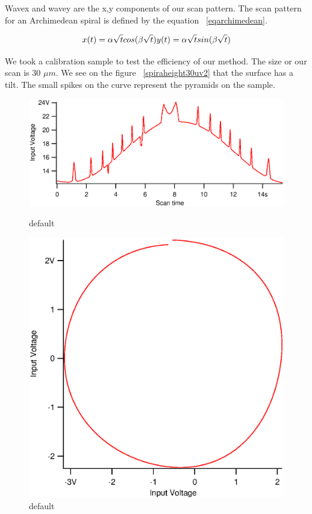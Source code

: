 Wavex and wavey are the x,y components of our scan pattern. The scan pattern for an Archimedean spiral is defined by the equation  ~\ref{eqarchimedean}.

\begin{equation}\label{eqarchimedean}
x(t)= \alpha \sqrt{t} cos(\beta \sqrt{t})\\
y(t)= \alpha \sqrt{t} sin(\beta \sqrt{t})
\end{equation}

We took a calibration sample to test the efficiency of our method. The size or our scan is 30 $\mu m$. We see on the figure  ~\ref{spiraheight30uv2} that the surface has a tilt. The small spikes on the curve represent the pyramids on the sample.

\begin{figure}[ht]
\begin{minipage}[b]{0.45\linewidth}
\centering
\includegraphics[width=\textwidth]{images/spiraheight30uv2.eps}
\caption{default}
\label{spiraheight30uv2}
\end{minipage}
\hspace{0.5cm}
\begin{minipage}[b]{0.45\linewidth}
\centering
\includegraphics[width=\textwidth]{images/xsenvsysen30u.eps}
\caption{default}
\label{xsenvsysen30u}
\end{minipage}
\end{figure}

